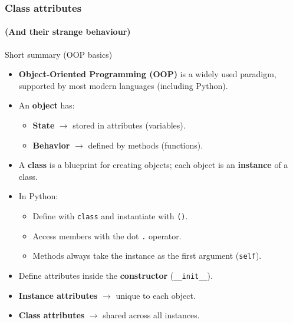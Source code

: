 \documentclass[9pt]{beamer}
\begin{document}
\begin{frame}
  \frametitle{Class attributes}
  \framesubtitle{(And their strange behaviour)}
  
\end{frame}


\begin{frame}{Short summary (OOP basics)}
\begin{itemize}
  \item \textbf{Object-Oriented Programming (OOP)} is a widely used paradigm, 
  	supported by most modern languages (including Python).  
  \smallskip
  \item An \textbf{object} has:
    \begin{itemize}
      \item \textbf{State} $\rightarrow$ stored in attributes (variables).  
      \item \textbf{Behavior} $\rightarrow$ defined by methods (functions).  
    \end{itemize}
  \smallskip
  \item A \textbf{class} is a blueprint for creating objects; each object is an
  	\textbf{instance} of a class. 
  \smallskip
  \item In Python:
    \begin{itemize}
      \item Define with \texttt{class} and instantiate with \texttt{()}.  
      \item Access members with the dot \texttt{.} operator.  
      \item Methods always take the instance as the first argument (\texttt{self}).  
    \end{itemize}
  \smallskip
  \item Define attributes inside the \textbf{constructor} (\texttt{\_\_init\_\_}).  
  \smallskip
  \item \textbf{Instance attributes} $\rightarrow$ unique to each object.  
  \smallskip
  \item \textbf{Class attributes} $\rightarrow$ shared across all instances.  
\end{itemize}
\end{frame}
\end{document}

